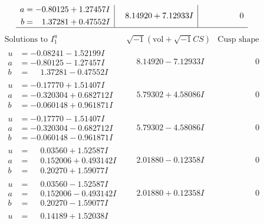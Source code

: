 \documentclass[1p]{elsarticle_modified}
\theoremstyle{definition}
\newcommand{\I}{\sqrt{-1}}
\begin{document}
$$\begin{array}{c|c|c}
\begin{aligned}
a &= -0.80125 + 1.27457 I \\
b &= \phantom{-}1.37281 + 0.47552 I\end{aligned}
 & \phantom{-}8.14920 + 7.12933 I & \phantom{-0.000000 } 0\\
 \hline 
 \end{array}$$\newpage$$\begin{array}{c|c|c}  
\text{Solutions to }I^u_{1}& \I (\text{vol} + \sqrt{-1}CS) & \text{Cusp shape}\\
 \hline 
\begin{aligned}
u &= -0.08241 - 1.52199 I \\
a &= -0.80125 - 1.27457 I \\
b &= \phantom{-}1.37281 - 0.47552 I\end{aligned}
 & \phantom{-}8.14920 - 7.12933 I & \phantom{-0.000000 } 0 \\ \hline\begin{aligned}
u &= -0.17770 + 1.51407 I \\
a &= -0.320304 + 0.682712 I \\
b &= -0.060148 + 0.961871 I\end{aligned}
 & \phantom{-}5.79302 + 4.58086 I & \phantom{-0.000000 } 0 \\ \hline\begin{aligned}
u &= -0.17770 - 1.51407 I \\
a &= -0.320304 - 0.682712 I \\
b &= -0.060148 - 0.961871 I\end{aligned}
 & \phantom{-}5.79302 - 4.58086 I & \phantom{-0.000000 } 0 \\ \hline\begin{aligned}
u &= \phantom{-}0.03560 + 1.52587 I \\
a &= \phantom{-}0.152006 + 0.493142 I \\
b &= \phantom{-}0.20270 + 1.59077 I\end{aligned}
 & \phantom{-}2.01880 - 0.12358 I & \phantom{-0.000000 } 0 \\ \hline\begin{aligned}
u &= \phantom{-}0.03560 - 1.52587 I \\
a &= \phantom{-}0.152006 - 0.493142 I \\
b &= \phantom{-}0.20270 - 1.59077 I\end{aligned}
 & \phantom{-}2.01880 + 0.12358 I & \phantom{-0.000000 } 0 \\ \hline\begin{aligned}
u &= \phantom{-}0.14189 + 1.52038 I \\

\end{aligned}
\end{array}$$
\end{document}
